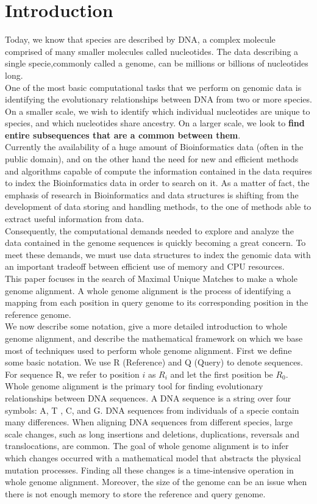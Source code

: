 \documentclass[runningheads,a4paper]{llncs}
\begin{document}
\section{Introduction}
Today, we know that species are described by DNA, a complex molecule comprised of many smaller molecules called nucleotides. The data describing a single specie,commonly called a genome, can be millions or billions of nucleotides long.\\
One of the most basic computational tasks that we perform on genomic data is identifying the evolutionary relationships between DNA from two or more species. On a smaller scale, we wish to identify which individual nucleotides are unique to species, and which nucleotides share ancestry. On a larger scale, we look to \textbf{find entire subsequences that are a common between them}.\\
Currently the availability of a huge amount of  Bioinformatics data (often in the public domain), and on the other hand the  need for new and efficient methods and algorithms capable of  compute the information contained in the data requires to index the Bioinformatics data in order to search on it. As a matter of fact, the  emphasis of research in Bioinformatics and data structures is shifting from the development of data storing and handling methods, to the one of methods able to  extract useful information from data.\\
Consequently, the computational demands needed to explore and analyze the data contained in the genome sequences is quickly becoming a great concern. To meet these demands, we must use data structures to index the genomic data with an important tradeoff between efficient use of memory and CPU resources.\\
This paper focuses in the search of Maximal Unique Matches to make a whole genome alignment. A whole genome alignment is the process of identifying a mapping from each position in query genome to its corresponding position in the reference genome.\\ 
We now describe some notation, give a more detailed introduction to whole genome alignment, and describe the mathematical framework on which we base most of techniques used to perform whole genome alignment. First we define some basic notation. We use R (Reference) and Q (Query) to denote sequences. For sequence R, we refer to position $i$ as $R_{i}$ and let the first position be $R_{0}$.\\
Whole genome alignment is the primary tool for finding evolutionary relationships between DNA sequences. A DNA sequence is a string over four symbols: A, T , C, and G. DNA sequences from individuals of a specie contain many differences. When aligning DNA sequences from different species, large scale changes, such as long insertions and deletions, duplications, reversals and translocations, are common. The goal of whole genome alignment is to infer which changes occurred with a mathematical model that abstracts the physical mutation processes. Finding all these changes is a time-intensive operation in whole genome alignment. Moreover, the size of the genome can be an issue when there is not enough memory to store the reference and query genome.\\
\end{document}
